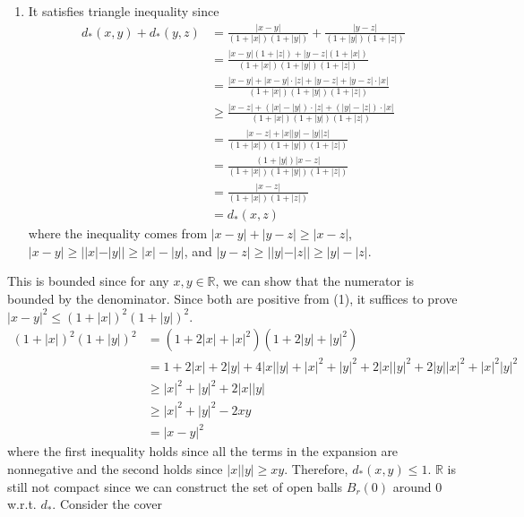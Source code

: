 \begin{solution}
\begin{enumerate}
        \item It satisfies triangle inequality since 
        \begin{align}
          d_\ast (x, y) + d_\ast (y, z) & = \frac{|x - y|}{(1 + |x|)(1 + |y|)} + \frac{|y - z|}{(1 + |y|)(1 + |z|)} \\
                                        & = \frac{|x - y|(1 + |z|) + |y - z|(1 + |x|)}{(1 + |x|)(1 + |y|)(1 + |z|)} \\
                                        & = \frac{|x - y| + |x - y| \cdot |z| + |y - z| + |y - z| \cdot |x|}{(1 + |x|)(1 + |y|)(1 + |z|)} \\ 
                                        & \geq \frac{|x - z| + (|x| - |y|) \cdot |z| + (|y| - |z|) \cdot |x|}{(1 + |x|)(1 + |y|)(1 + |z|)} \\
                                        & = \frac{|x - z| + |x| |y| - |y| |z|}{(1 + |x|)(1 + |y|)(1 + |z|)} \\ 
                                        & = \frac{(1 + |y|)|x - z|}{(1 + |x|)(1 + |y|)(1 + |z|)} \\  
                                        & = \frac{|x - z|}{(1 + |x|)(1 + |z|)} \\ 
                                        & = d_\ast (x, z)
        \end{align}
        where the inequality comes from $|x - y| + |y - z| \geq |x - z|$, $|x - y| \geq ||x| - |y|| \geq |x| - |y|$, and $|y - z| \geq ||y| - |z|| \geq |y| - |z|$. 
    \end{enumerate}
    This is bounded since for any $x, y \in \mathbb{R}$, we can show that the numerator is bounded by the denominator. Since both are positive from (1), it suffices to prove $|x - y|^2 \leq (1 + |x|)^2 (1 + |y|)^2$. 
    \begin{align}
      (1 + |x|)^2 (1 + |y|)^2 & = (1 + 2|x| + |x|^2) (1 + 2|y| + |y|^2) \\
                              & = 1 + 2|x| + 2|y| + 4|x||y| + |x|^2 + |y|^2 + 2|x||y|^2 + 2|y||x|^2 + |x|^2 |y|^2 \\ 
                              & \geq |x|^2 + |y|^2 + 2 |x| |y| \\
                              & \geq |x|^2 + |y|^2 - 2 xy \\
                              & = |x - y|^2
    \end{align}
    where the first inequality holds since all the terms in the expansion are nonnegative and the second holds since $|x||y| \geq xy$. Therefore, $d_\ast (x, y) \leq 1$. $\mathbb{R}$ is still not compact since we can construct the set of open balls $B_r (0)$ around $0$ w.r.t. $d_\ast$. Consider the cover 

\end{solution}
